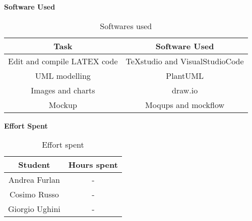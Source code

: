 \begin{flushleft}
\textbf{Software Used}
\end{flushleft}
\begin{table}[htp]
	\centering
		\begin{tabular}{|c|c|}
			\hline
			Task&Software Used\\
			\hline
			Edit and compile LATEX code&TeXstudio and VisualStudioCode\\
			\hline
			UML modelling&PlantUML\\
			\hline
			Images and charts&draw.io\\
			\hline
			Mockup&Moqups and mockflow\\
			\hline
		\end{tabular}
	\caption{Softwares used} 
\end{table}
\begin{flushleft}
\textbf{Effort Spent}
\end{flushleft}
\begin{table}[htp]
	\centering
		\begin{tabular}{|c|c|}
			\hline
			Student&Hours spent\\
			\hline
			Andrea Furlan&-\\
			\hline
			Cosimo Russo&-\\
			\hline
			Giorgio Ughini&-\\
			\hline
		\end{tabular}
	\caption{Effort spent} 
\end{table}